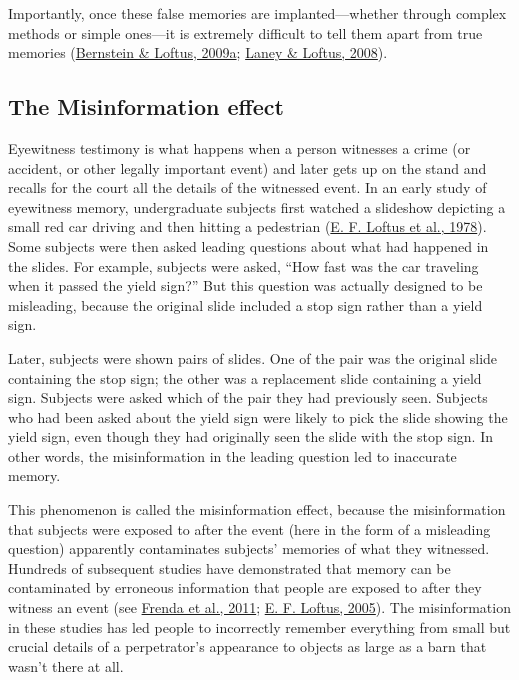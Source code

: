 \documentclass[
]{krantz}
\begin{document}
Importantly, once these false memories are implanted---whether through complex methods or simple ones---it is extremely difficult to tell them apart from true memories (\protect\hyperlink{ref-Bernstein2009a}{Bernstein \& Loftus, 2009a}; \protect\hyperlink{ref-Laney2008}{Laney \& Loftus, 2008}).

\hypertarget{the-misinformation-effect}{%
\subsection*{The Misinformation effect}\label{the-misinformation-effect}}


Eyewitness testimony is what happens when a person witnesses a crime (or accident, or other legally important event) and later gets up on the stand and recalls for the court all the details of the witnessed event. In an early study of eyewitness memory, undergraduate subjects first watched a slideshow depicting a small red car driving and then hitting a pedestrian (\protect\hyperlink{ref-loftus1978semantic}{E. F. Loftus et al., 1978}). Some subjects were then asked leading questions about what had happened in the slides. For example, subjects were asked, ``How fast was the car traveling when it passed the yield sign?'' But this question was actually designed to be misleading, because the original slide included a stop sign rather than a yield sign.

Later, subjects were shown pairs of slides. One of the pair was the original slide containing the stop sign; the other was a replacement slide containing a yield sign. Subjects were asked which of the pair they had previously seen. Subjects who had been asked about the yield sign were likely to pick the slide showing the yield sign, even though they had originally seen the slide with the stop sign. In other words, the misinformation in the leading question led to inaccurate memory.

This phenomenon is called the misinformation effect, because the misinformation that subjects were exposed to after the event (here in the form of a misleading question) apparently contaminates subjects' memories of what they witnessed. Hundreds of subsequent studies have demonstrated that memory can be contaminated by erroneous information that people are exposed to after they witness an event (see \protect\hyperlink{ref-frenda2011current}{Frenda et al., 2011}; \protect\hyperlink{ref-loftus2005planting}{E. F. Loftus, 2005}). The misinformation in these studies has led people to incorrectly remember everything from small but crucial details of a perpetrator's appearance to objects as large as a barn that wasn't there at all.
\end{document}
